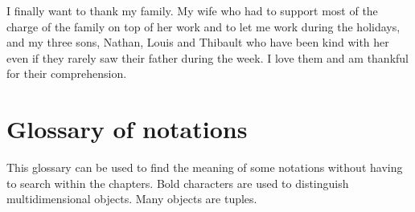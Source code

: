 \documentclass[12pt,a4paper]{report}
\begin{document}
	I finally want to thank my family. My wife who had to support most of the charge of the family on top of her work and to let me work during the holidays, and my three sons, Nathan, Louis and Thibault who have been kind with her even if they rarely saw their father during the week. I love them and am thankful for their comprehension.




\tableofcontents

\chapter*{Glossary of notations}\label{glossaire}
This glossary can be used to find the meaning of some notations without having to search within the chapters.
Bold characters are used to distinguish multidimensional objects. Many objects are tuples.
\end{document}
